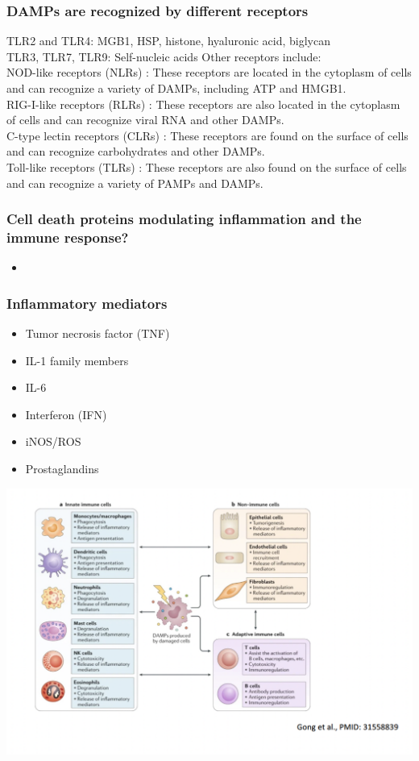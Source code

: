 \begin{itemize}
\begin{itemize}
\subsubsection{DAMPs are recognized by different receptors}
TLR2 and TLR4: MGB1, HSP, histone, hyaluronic acid, biglycan
\\TLR3, TLR7, TLR9: Self-nucleic acids
Other receptors include:
\\NOD-like receptors (NLRs) : These receptors are located in the cytoplasm of cells and can recognize a variety of DAMPs, including ATP and HMGB1.
\\RIG-I-like receptors (RLRs) : These receptors are also located in the cytoplasm of cells and can recognize viral RNA and other DAMPs.
\\C-type lectin receptors (CLRs) : These receptors are found on the surface of cells and can recognize carbohydrates and other DAMPs.
\\Toll-like receptors (TLRs) : These receptors are also found on the surface of cells and can recognize a variety of PAMPs and DAMPs.
\subsubsection{Cell death proteins modulating inflammation and the immune response?}
\begin{itemize}
    \item 
\end{itemize}
\subsubsection{Inflammatory mediators}
\begin{itemize}
    \item Tumor necrosis factor (TNF)
    \item IL-1 family members
    \item IL-6
    \item Interferon (IFN)
    \item iNOS/ROS
    \item Prostaglandins
\end{itemize}

\includegraphics[width= 1\textwidth]{Images/Immunity.png}\\[1cm]

\end{itemize}
\end{itemize}
